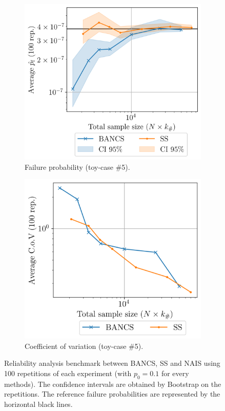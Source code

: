 \begin{figure}
    \begin{subfigure}[b]{0.49\linewidth}
        \centering
        \includegraphics[width=\linewidth]{part3/figures/BANCS/Oscillator_mean.png}
        \caption{Failure probability (toy-case \#5).}
    \end{subfigure}
    \begin{subfigure}[b]{0.47\linewidth}
        \centering
        \includegraphics[width=\linewidth]{part3/figures/BANCS/Oscillator_cov.png}
        \caption{Coefficient of variation (toy-case \#5).}
    \end{subfigure}
    \caption{Reliability analysis benchmark between BANCS, SS and NAIS using 100 repetitions of each experiment (with $p_0=0.1$ for every methods). 
                The confidence intervals are obtained by Bootstrap on the repetitions. 
                The reference failure probabilities are represented by the horizontal black lines.}
    \label{fig:bancs_benchmark}
\end{figure}

